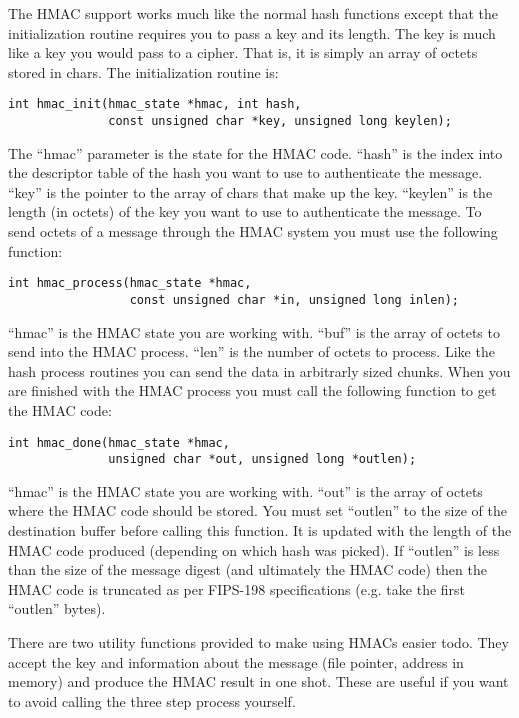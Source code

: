\documentclass[a4paper]{book}
\begin{document}
The HMAC support works much like the normal hash functions except that the initialization routine requires you to pass a key 
and its length.  The key is much like a key you would pass to a cipher.  That is, it is simply an array of octets stored in
chars.  The initialization routine is:
\begin{verbatim}
int hmac_init(hmac_state *hmac, int hash, 
              const unsigned char *key, unsigned long keylen);
\end{verbatim}
The ``hmac'' parameter is the state for the HMAC code.  ``hash'' is the index into the descriptor table of the hash you want
to use to authenticate the message.  ``key'' is the pointer to the array of chars that make up the key.  ``keylen'' is the
length (in octets) of the key you want to use to authenticate the message.  To send octets of a message through the HMAC system you must use the following function:
\begin{verbatim}
int hmac_process(hmac_state *hmac, 
                 const unsigned char *in, unsigned long inlen);
\end{verbatim}
``hmac'' is the HMAC state you are working with. ``buf'' is the array of octets to send into the HMAC process.  ``len'' is the
number of octets to process.  Like the hash process routines you can send the data in arbitrarly sized chunks. When you 
are finished with the HMAC process you must call the following function to get the HMAC code:
\begin{verbatim}
int hmac_done(hmac_state *hmac, 
              unsigned char *out, unsigned long *outlen);
\end{verbatim}
``hmac'' is the HMAC state you are working with.  ``out'' is the array of octets where the HMAC code should be stored.  You must
set ``outlen'' to the size of the destination buffer before calling this function.  It is updated with the length of the HMAC code
produced (depending on which hash was picked).  If ``outlen'' is less than the size of the message digest (and ultimately
the HMAC code) then the HMAC code is truncated as per FIPS-198 specifications (e.g. take the first ``outlen'' bytes).

There are two  utility functions provided to make using HMACs easier todo.  They accept the key and information about the
message (file pointer, address in memory) and produce the HMAC result in one shot.  These are useful if you want to avoid
calling the three step process yourself.
\end{document}
